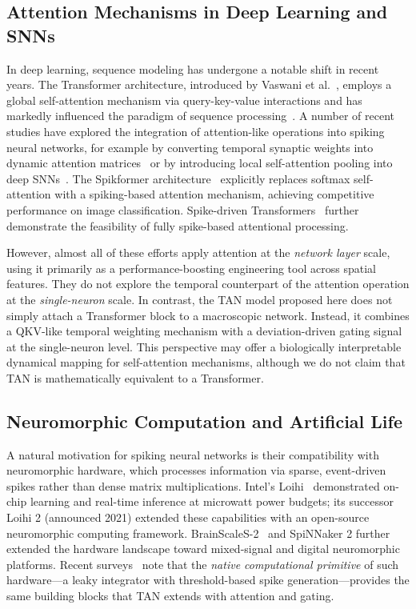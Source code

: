 \subsection{Attention Mechanisms in Deep Learning and SNNs}

In deep learning, sequence modeling has undergone a notable shift in recent years. The Transformer architecture, introduced by Vaswani et al.~\cite{vaswani2017}, employs a global self-attention mechanism via query-key-value interactions and has markedly influenced the paradigm of sequence processing~\cite{lin2022survey,tay2022efficient}. A number of recent studies have explored the integration of attention-like operations into spiking neural networks, for example by converting temporal synaptic weights into dynamic attention matrices~\cite{yao2021} or by introducing local self-attention pooling into deep SNNs~\cite{zheng2020,zhou2023spikformer,yao2023spikedriven}. The Spikformer architecture~\cite{zhou2023spikformer} explicitly replaces softmax self-attention with a spiking-based attention mechanism, achieving competitive performance on image classification. Spike-driven Transformers~\cite{yao2023spikedriven} further demonstrate the feasibility of fully spike-based attentional processing.

However, almost all of these efforts apply attention at the \textit{network layer} scale, using it primarily as a performance-boosting engineering tool across spatial features. They do not explore the temporal counterpart of the attention operation at the \textit{single-neuron} scale. In contrast, the TAN model proposed here does not simply attach a Transformer block to a macroscopic network. Instead, it combines a QKV-like temporal weighting mechanism with a deviation-driven gating signal at the single-neuron level. This perspective may offer a biologically interpretable dynamical mapping for self-attention mechanisms, although we do not claim that TAN is mathematically equivalent to a Transformer.

\subsection{Neuromorphic Computation and Artificial Life}

A natural motivation for spiking neural networks is their compatibility with neuromorphic hardware, which processes information via sparse, event-driven spikes rather than dense matrix multiplications. Intel's Loihi~\cite{davies2018} demonstrated on-chip learning and real-time inference at microwatt power budgets; its successor Loihi 2 (announced 2021) extended these capabilities with an open-source neuromorphic computing framework. BrainScaleS-2~\cite{pehle2022} and SpiNNaker 2 further extended the hardware landscape toward mixed-signal and digital neuromorphic platforms. Recent surveys~\cite{frenkel2023} note that the \textit{native computational primitive} of such hardware---a leaky integrator with threshold-based spike generation---provides the same building blocks that TAN extends with attention and gating.

